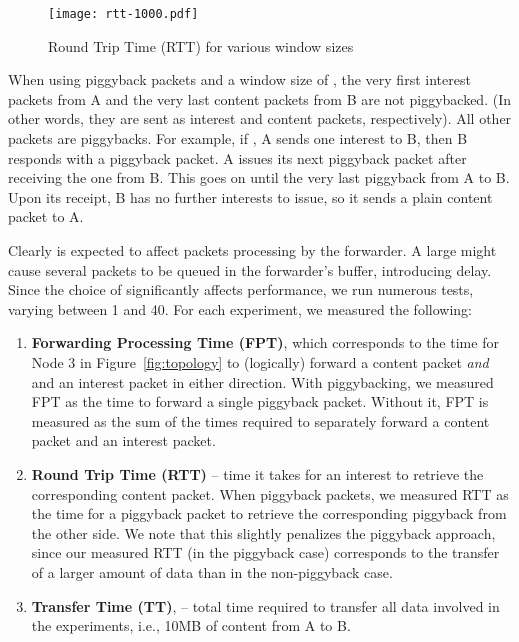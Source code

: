 \documentclass[conference]{IEEEtran}
\begin{document}
\begin{figure*}[htb]
\vspace{0.2cm}
\centering
\texttt{[image: rtt-1000.pdf]}
\caption{Round Trip Time (RTT) for various window sizes}
\label{fig:rtt-1000}
\end{figure*}


When using piggyback packets and a window size of , the very first  interest packets from 
A and the very last  content packets from B are not piggybacked. (In other words, they are sent
as interest and content packets, respectively). All other packets are piggybacks.
For example, if , A sends one interest to B, then B responds with a piggyback packet. 
A issues its next piggyback packet after receiving the one from B. 
This goes on until the very last piggyback from A to B. Upon its receipt, B has no further interests 
to issue, so it sends a plain content packet to A.

Clearly  is expected to affect packets processing  by the forwarder. A large  
 might cause several packets to be queued in the forwarder's buffer, introducing delay. 
Since the choice of  significantly affects performance, we run numerous tests,
varying  between 1 and 40.
For each experiment, we measured the following: 
\begin{enumerate}
\item {\bf Forwarding Processing Time (FPT)}, which corresponds to the time for
Node 3 in Figure~\ref{fig:topology} to (logically) forward a content packet {\em and} and an interest packet 
in either direction. With piggybacking, we measured FPT as the time to forward 
a single piggyback packet. Without it,  FPT is measured as the sum of the times required to 
separately forward a content packet and an interest packet.

\item {\bf Round Trip Time (RTT)} --  time it takes for an interest to retrieve the corresponding 
content packet. 
When piggyback packets, we measured RTT as the time for a 
piggyback packet to retrieve the corresponding piggyback from the other side.
We note that this slightly penalizes the piggyback approach, since our measured RTT (in 
the piggyback case) corresponds to the transfer of a larger amount of data 
than in the non-piggyback case.

\item {\bf Transfer Time (TT)}, -- total time required to transfer all data involved in the 
experiments, i.e., 10MB of content from A to B.
\end{enumerate}
\end{document}
